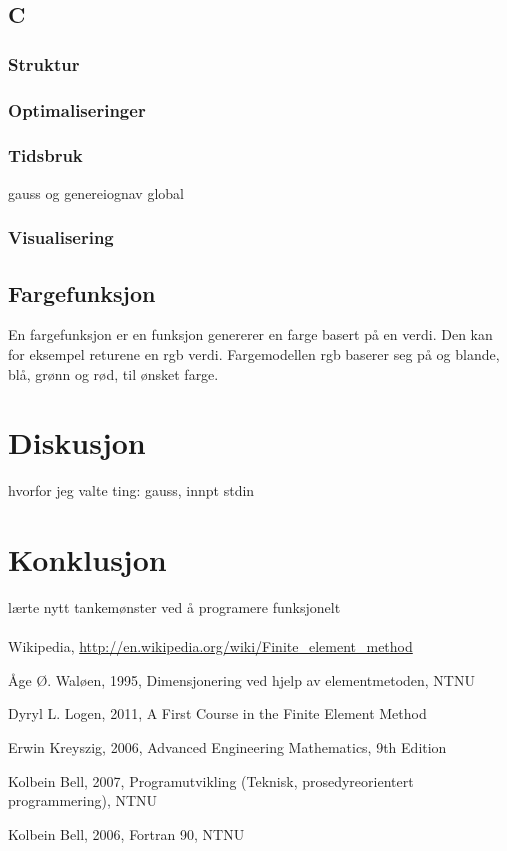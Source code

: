 \documentclass[10pt,a4paper, norsk]{article}
\begin{document}
\subsection{C}

\subsubsection{Struktur}
\subsubsection{Optimaliseringer}
\subsubsection{Tidsbruk}

gauss og genereiognav global
\subsubsection{Visualisering}




\subsection{Fargefunksjon}
En fargefunksjon er en funksjon genererer en farge basert på en verdi. Den kan for eksempel returene en rgb verdi. Fargemodellen rgb baserer seg på og blande, blå, grønn og rød, til ønsket farge. 


\section{Diskusjon}

hvorfor jeg valte ting: gauss, innpt stdin

\section{Konklusjon}

lærte nytt tankemønster ved å programere funksjonelt

\paragraph{} 


\begin{thebibliography}{9}

  Wikipedia,
  \url{http://en.wikipedia.org/wiki/Finite_element_method}
  

  Åge Ø. Waløen,
  1995, 
  Dimensjonering ved hjelp av elementmetoden, NTNU
 
	Dyryl L. Logen, 2011, A First Course in the Finite Element Method
	
Erwin Kreyszig, 2006, Advanced Engineering Mathematics, 9th Edition

Kolbein Bell, 2007, Programutvikling (Teknisk, prosedyreorientert programmering), NTNU

Kolbein Bell, 2006, Fortran 90, NTNU

\end{thebibliography}
\end{document}
